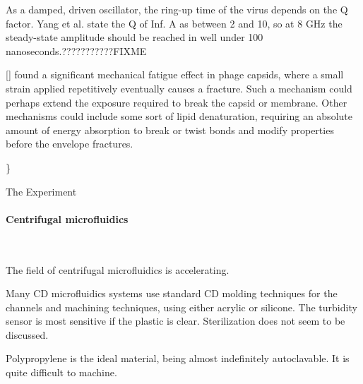 \documentclass[fleqn,10pt]{article}
\begin{document}
As a damped, driven oscillator, the ring-up time of the virus depends on the Q factor. Yang et al. state the Q of Inf. A as between 2 and 10, so at 8 GHz the steady-state amplitude should be reached in well under 100 nanoseconds.???????????FIXME

[] found a significant mechanical fatigue effect in phage capsids, where a small strain applied repetitively eventually causes a fracture. Such a mechanism could perhaps extend the exposure required to break the capsid or membrane. Other mechanisms could include some sort of lipid denaturation, requiring an absolute amount of energy absorption to break or twist bonds and modify properties before the envelope fractures.


{\color{red}  \} } 















\clearpage
\begin{multicols}{1}
{\Large The Experiment}\\

\paragraph{\textbf{Centrifugal microfluidics}}\

The field of centrifugal microfluidics is accelerating. 

Many CD microfluidics systems use standard CD molding techniques for the channels and machining techniques, using either acrylic or silicone. The turbidity sensor is most sensitive if the plastic is clear. Sterilization does not seem to be discussed. 

Polypropylene is the ideal material, being almost indefinitely autoclavable. It is quite difficult to machine.

\end{multicols}
\end{document}
